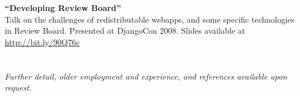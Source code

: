 \documentclass[margin,line]{resume}
\begin{document}
\begin{resume}
    \ifcv
        {\bf``Developing Review Board''} \vspace{2mm}\\\vspace{1mm}%
        Talk on the challenges of redistributable webapps, and some specific
        technologies in Review Board. Presented at DjangoCon 2008. Slides
        available at \url{http://bit.ly/90Q76c}
    \fi


    \ifcv
    \else
        \section{}
        {\sl Further detail, older employment and experience, and references available upon request.}
    \fi


\end{resume}
\end{document}

